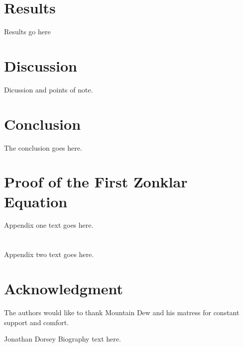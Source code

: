 \documentclass[journal]{IEEEtran}
\begin{document}
 \section{Results}

Results go here

\section{Discussion}

Dicussion and points of note.


\section{Conclusion}
The conclusion goes here.


\appendices
\section{Proof of the First Zonklar Equation}
Appendix one text goes here.


\section{}
Appendix two text goes here.


\section*{Acknowledgment}


The authors would like to thank Mountain Dew and his matress for constant support and comfort.



\ifCLASSOPTIONcaptionsoff
  \newpage
\fi



%
%
%
%
\cite{craig_introduction_2005}
\cite{khalil_nonlinear_2002}
\cite{rawlings_model_2017}
\cite{armstrong_explicit_1986}
\cite{ogata_modern_2010}
\cite{meriam_engineering_1993}
\cite{greenwood_advanced_2006}
\cite{borrelli_predictive_2017}
\cite{boyd_convex_2004}
\cite{slotine_applied_1991}

\printbibliography

\begin{IEEEbiographynophoto}{Jonathan Dorsey}
Biography text here.
\end{IEEEbiographynophoto}
\end{document}
